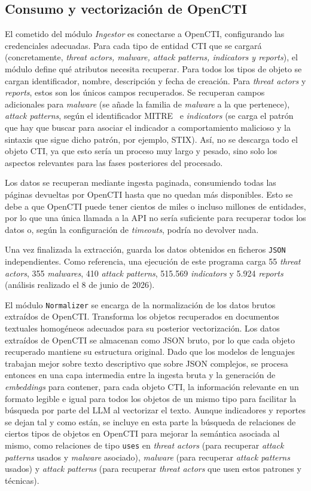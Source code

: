\documentclass[12pt]{report}
\begin{document}
\subsection{Consumo y vectorización de OpenCTI}
El cometido del módulo \textit{Ingestor} es conectarse a OpenCTI, configurando las credenciales adecuadas. Para cada tipo de entidad CTI que se cargará (concretamente, \textit{threat actors, malware, attack patterns, indicators y reports}), el módulo define qué atributos necesita recuperar. Para todos los tipos de objeto se cargan identificador, nombre, descripción y fecha de creación. Para \textit{threat actors} y \textit{reports}, estos son los únicos campos recuperados. Se recuperan campos adicionales para \textit{malware} (se añade la familia de \textit{malware} a la que pertenece), \textit{attack patterns}, según el identificador MITRE~\cite{attck} e \textit{indicators} (se carga el patrón que hay que buscar para asociar el indicador a comportamiento malicioso y la sintaxis que sigue dicho patrón, por ejemplo, STIX). Así, no se descarga todo el objeto CTI, ya que esto sería un proceso muy largo y pesado, sino solo los aspectos relevantes para las fases posteriores del procesado.

Los datos se recuperan mediante ingesta paginada, consumiendo todas las páginas devueltas por OpenCTI hasta que no quedan más disponibles. Esto se debe a que OpenCTI puede tener cientos de miles o incluso millones de entidades, por lo que una única llamada a la API no sería suficiente para recuperar todos los datos o, según la configuración de \textit{timeouts}, podría no devolver nada. 

Una vez finalizada la extracción, guarda los datos obtenidos en ficheros \texttt{JSON} independientes. Como referencia, una ejecución de este programa carga 55 \textit{threat actors}, 355 \textit{malwares}, 410 \textit{attack patterns}, 515.569 \textit{indicators} y 5.924 \textit{reports} (análisis realizado el 8 de junio de 2026).

El módulo \texttt{Normalizer} se encarga de la normalización de los datos brutos extraídos de OpenCTI. Transforma los objetos recuperados en documentos textuales homogéneos adecuados para su posterior vectorización. Los datos extraídos de OpenCTI se almacenan como JSON bruto, por lo que cada objeto recuperado mantiene su estructura original. Dado que los modelos de lenguajes trabajan mejor sobre texto descriptivo que sobre JSON complejos, se procesa entonces en una capa intermedia entre la ingesta bruta y la generación de \textit{embeddings} para contener, para cada objeto CTI, la información relevante en un formato legible e igual para todos los objetos de un mismo tipo para facilitar la búsqueda por parte del LLM al vectorizar el texto. Aunque indicadores y reportes se dejan tal y como están, se incluye en esta parte la búsqueda de relaciones de ciertos tipos de objetos en OpenCTI para mejorar la semántica asociada al mismo, como relaciones de tipo \texttt{uses} en \textit{threat actors} (para recuperar \textit{attack patterns} usados y \textit{malware} asociado), \textit{malware} (para recuperar \textit{attack patterns} usados) y \textit{attack patterns} (para recuperar \textit{threat actors} que usen estos patrones y técnicas).
\end{document}
